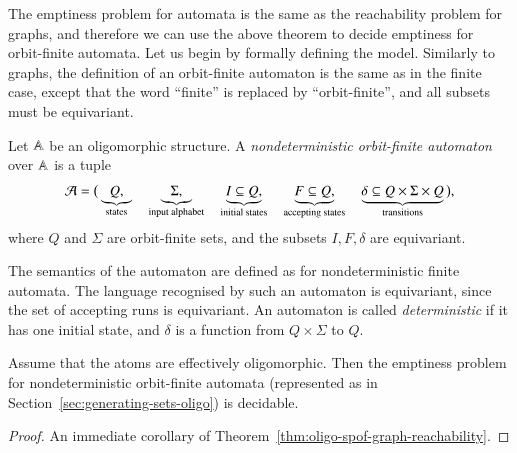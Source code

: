 The emptiness problem for automata is the same as the reachability problem for graphs, and therefore we can use the above theorem to decide emptiness for orbit-finite automata. Let us begin by formally defining the model.
Similarly to graphs, the definition of an orbit-finite automaton is the same as in the finite case, except that the word ``finite'' is replaced by ``orbit-finite'', and all subsets must be equivariant.
 
\begin{definition}\label{def:orbit-finite-automata}
	Let $\mathbb A$ be an oligomorphic structure. 
	A \emph{nondeterministic orbit-finite automaton} over $\mathbb A$ is a tuple
	\begin{align*}
 {\mathcal A} = \big(\underbrace{Q,}_{\text{states}} \quad \underbrace{\Sigma,}_{\text{input alphabet}} \quad \underbrace{I \subseteq Q,}_{\text{initial states}} \quad \underbrace{F \subseteq Q,}_{\text{accepting states}} \quad \underbrace{\delta \subseteq Q \times \Sigma \times Q}_{\text{transitions}} \big),
\end{align*}
where $Q$ and $\Sigma$  are orbit-finite sets, and the subsets $I, F, \delta$ are equivariant.
\end{definition}

The semantics of the automaton are defined as for nondeterministic finite automata. The language recognised by such an automaton is equivariant, since the set of accepting runs is equivariant.
An automaton is called \emph{deterministic} if it has one initial state, and $\delta$ is a function from $Q \times \Sigma$ to $Q$. 


\begin{theorem}\label{thm:olig-nfa-nonemptiness}
	Assume that the atoms are effectively oligomorphic.
	Then the emptiness problem for nondeterministic orbit-finite automata (represented as in Section~\ref{sec:generating-sets-oligo}) is decidable.  
	\end{theorem}
\begin{proof}
	An immediate corollary of Theorem~\ref{thm:oligo-spof-graph-reachability}. 
\end{proof}

